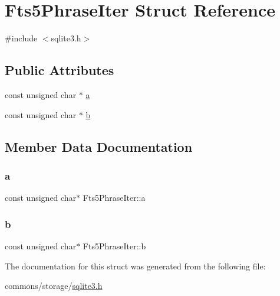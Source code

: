 \hypertarget{struct_fts5_phrase_iter}{}\section{Fts5\+Phrase\+Iter Struct Reference}
\label{struct_fts5_phrase_iter}


{\ttfamily \#include $<$sqlite3.\+h$>$}

\subsection*{Public Attributes}
\begin{DoxyCompactItemize}
\item 
const unsigned char $\ast$ \mbox{\hyperlink{struct_fts5_phrase_iter_a335969d1ac0fcbb94173c472a3f179ae}{a}}
\item 
const unsigned char $\ast$ \mbox{\hyperlink{struct_fts5_phrase_iter_a459180b0d670604aa38b3ac94be6adda}{b}}
\end{DoxyCompactItemize}


\subsection{Member Data Documentation}
\mbox{\label{struct_fts5_phrase_iter_a335969d1ac0fcbb94173c472a3f179ae}} 
\subsubsection{\texorpdfstring{a}{a}}
{\footnotesize\ttfamily const unsigned char$\ast$ Fts5\+Phrase\+Iter\+::a}

\mbox{\label{struct_fts5_phrase_iter_a459180b0d670604aa38b3ac94be6adda}} 
\subsubsection{\texorpdfstring{b}{b}}
{\footnotesize\ttfamily const unsigned char$\ast$ Fts5\+Phrase\+Iter\+::b}



The documentation for this struct was generated from the following file\+:\begin{DoxyCompactItemize}
\item 
commons/storage/\mbox{\hyperlink{sqlite3_8h}{sqlite3.\+h}}\end{DoxyCompactItemize}
